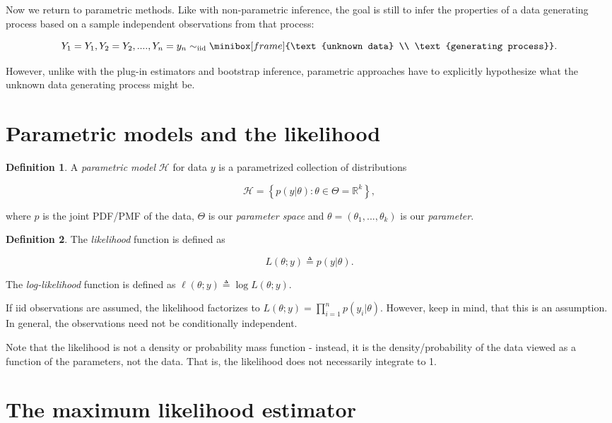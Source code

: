 \documentclass{book}
\theoremstyle{plain}%
\theoremstyle{definition}
\newtheorem{definition}{Definition}[section]
\begin{document}
Now we return to parametric methods. Like with non-parametric inference, the goal is still to infer the properties of a data generating process based on a sample independent observations from that process:

$$Y_1 = Y_1, Y_2 = Y_2, ...., Y_n = y_n \sim_\text{iid} \minibox[frame]{\text{unknown data} \\ \text{generating process}}.$$

However, unlike with the plug-in estimators and bootstrap inference, parametric approaches have to explicitly hypothesize what the unknown data generating process might be.


\section{Parametric models and the likelihood}

\begin{definition} A \emph{parametric model} $\mathcal{H}$ for data $y$ is a parametrized collection of distributions

$$\mathcal{H} = \left\lbrace p(y|\theta) : \theta \in \Theta = \mathbb{R}^k \right\rbrace,$$

where $p$ is the joint PDF/PMF of the data, $\Theta$ is our \textit{parameter space} and $\theta = (\theta_1,...,\theta_k)$ is our \textit{parameter}.

\end{definition}

\begin{definition} The \emph{likelihood} function is defined as

$$L(\theta;y) \triangleq p(y|\theta).$$

The \emph{log-likelihood} function is defined as  $\ell(\theta;y) \triangleq \log L(\theta;y)$.
\end{definition}

If iid observations are assumed, the likelihood factorizes to $L(\theta;y) = \prod_{i=1}^n p(y_i|\theta)$. However, keep in mind, that this is an assumption. In general, the observations need not be conditionally independent.

Note that the likelihood is not a density or probability mass function - instead, it is the density/probability of the data viewed as a function of the parameters, not the data. That is, the likelihood does not necessarily integrate to 1.

\section{The maximum likelihood estimator}
\end{document}
